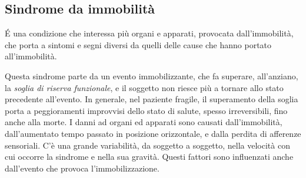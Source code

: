\subsection{Sindrome da immobilità}
\'E una condizione che interessa più organi e apparati, provocata 
dall'immobilità, che porta a sintomi e segni diversi da quelli delle cause che 
hanno portato all'immobilità.

Questa sindrome parte da un evento immobilizzante, che fa superare, 
all'anziano, la \textit{soglia di riserva funzionale}, e il soggetto non riesce 
più a tornare allo stato precedente all'evento. In generale, nel paziente 
fragile, il superamento della soglia porta a peggioramenti improvvisi dello 
stato di salute, spesso irreversibili, fino anche alla morte.
I danni ad organi ed apparati sono causati dall'immobilità, dall'aumentato 
tempo passato in posizione orizzontale, e dalla perdita di afferenze 
sensoriali.
C'è una grande variabilità, da soggetto a soggetto, nella velocità con cui 
occorre la sindrome e nella sua gravità. Questi fattori sono influenzati anche 
dall'evento che provoca l'immobilizzazione.

